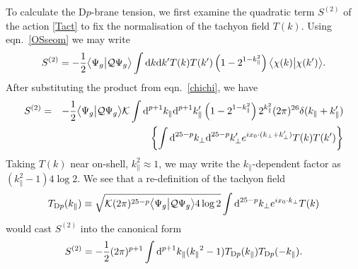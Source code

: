 \documentclass[letterpaper,12pt]{article}
\def\Pcm#1{{\mathcal{#1}}}
\def\nn{\nonumber}
\def\er#1{eqn.~\eqref{#1}}
\newcommand{\Dp}{\textup{D}p}
\newcommand{\td}{\textup{d}}
\begin{document}
To calculate the D$p$-brane tension, we first examine the quadratic term $S^{(2)}$ of
the action \eqref{Tact} to fix the normalisation of the tachyon field $T(k)$.
Using \er{OSseom} we may write 
\begin{equation}
S^{(2)}=-\frac12 \big\langle\Psi_g\big|\Pcm{Q}\Psi_g\big\rangle
   \int \td k \td k' T(k) T(k') \left(1-2^{1-k_\parallel^2}\right)
\big\langle\chi(k)\big|\chi(k')\big\rangle
.\end{equation}
After substituting the product from \er{chichi}, we have
\begin{eqnarray}
S^{(2)}&=&-\frac12 \big\langle\Psi_g\big|\Pcm{Q}\Psi_g\big\rangle \Pcm{K} 
    \int \td^{p+1} k_\parallel \td^{p+1} k'_\parallel
    \left(1-2^{1-k_\parallel^2}\right)
    2^{k_\parallel^2} 
    (2\pi)^{26}
    \delta(k_\parallel+k_\parallel')
   \nn\\
   && \left\{
    \int \td^{25-p} k_\perp \td^{25-p} k'_\perp
    e^{ix_0\cdot(k_\perp+k_\perp')} 
    T(k) T(k')
    \right\}
\end{eqnarray}
Taking $T(k)$ near on-shell, $k_\parallel^2\approx1$, we may write the $k_\parallel$-dependent 
factor as $(k_\parallel^2-1)4\log 2$. We see that a re-definition of the tachyon field
\begin{equation}
\label{newtach}
  T_{\Dp}(k_\parallel) \equiv \sqrt{\Pcm{K}(2\pi)^{25-p}\big\langle\Psi_g\big|\Pcm{Q}\Psi_g\big\rangle 4\log2 } 
   \int \td^{25-p} k_\perp 
    e^{ix_0 \cdot k_\perp} T(k)
\end{equation}
would cast $S^{(2)}$ into the canonical form
\begin{equation}
S^{(2)}=-\frac12 (2\pi)^{p+1} \int \td^{p+1} k_\parallel ({k_\parallel}^2-1) T_{\Dp}
   ( k_\parallel )T_{\Dp}(-k_\parallel ) 
.\end{equation}
\end{document}
